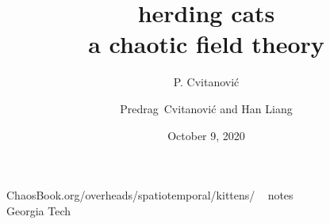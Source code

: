 



                        \newif\ifboyscout\boyscouttrue          %
                        \newif\ifsubmission\submissionfalse     %
                        \newif\ifblog\blogfalse %


\usepackage[font=scriptsize, labelfont=bf]{caption}
\usepackage[
    backend=biber,  %
    sorting=nyt,
    style=numeric, %
    natbib=true,
    style=phys, %
    biblabel= brackets, %
    articletitle=false, %
    pageranges = true , %
    sortlocale=en_US,
    firstinits=true,
    url=false, %
    doi=false, %
    eprint=false
]{biblatex}



\renewcommand{\Ssym}[1]{{\ensuremath{m_{#1}}}}    %


\title{
{\huge herding cats} %
    \\
{a chaotic field theory}
}
\author{P. Cvitanovi\'c}
\author[Cvitanovi\'c]
{
  \textcolor{green!50!black}{
  {Predrag~Cvitanovi\'c
   and
   Han Liang
  }	%
  }
}
\institute
{
 ChaosBook.org/overheads/spatiotemporal/kittens/   ~ notes
 \\
               Georgia Tech
 }
\date{October 9, 2020}


